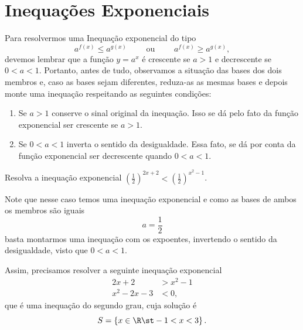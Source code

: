 \section{Inequações Exponenciais}

Para resolvermos uma Inequação exponencial do tipo
\[
  a^{f(x)} \leq a^{g(x)} \qquad\text{ ou }\qquad
  a^{f(x)} \geq a^{g(x)},
\]
devemos lembrar que a função $y=a^x$ é crescente se $a>1$ e decrescente
se $0 < a< 1$.
Portanto, antes de tudo, observamos a situação das bases dos dois membros e,
caso as bases sejam diferentes, reduza-as as mesmas bases e depois monte
uma inequação respeitando as seguintes condições:
\begin{enumerate}
    \item Se $a>1$ conserve o sinal original da inequação. Isso se dá pelo fato
      da função exponencial ser crescente se $a>1$.

    \item Se $0< a< 1$ inverta o sentido da desigualdade. Essa fato, se dá por
      conta da função exponencial ser decrescente quando $0< a< 1$.
\end{enumerate}

\begin{example}
  Resolva a inequação exponencial
  \(
    \left( \frac{1}{2} \right)^{2x+2} <
    \left( \frac{1}{2} \right)^{x^2-1}
  \).

  \solution
  Note que nesse caso temos uma inequação exponencial e como as bases de ambos
  os membros são iguais
  \[
    a = \frac{1}{2}
  \]
  basta montarmos uma inequação com os expoentes,
  invertendo o sentido da desigualdade, visto que $0 < a < 1$.

  Assim, precisamos resolver a seguinte inequação exponencial
  \begin{align*}
    2x + 2       & > x^2 - 1 \\
    x^2 - 2x - 3 & < 0,
  \end{align*}
  que é uma inequação do segundo grau, cuja solução é
  \[
    S = \left\{ x \in \R \st -1 < x < 3 \right\}.
  \]
\end{example}

